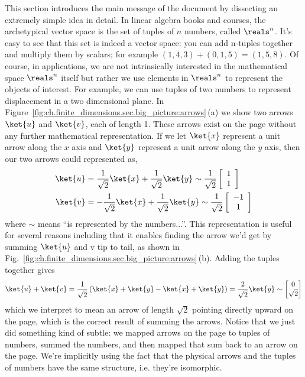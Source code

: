 
This section introduces the main message of the document by dissecting an extremely simple idea in detail.
In linear algebra books and courses, the archetypical vector space is the set of tuples of $n$ numbers, called $\reals^n$.
It's easy to see that this set is indeed a vector space: you can add n-tuples together and multiply them by scalars; for example $(1,4,3) + (0,1,5) = (1,5,8)$.
Of course, in applications, we are not intrinsically interested in the mathematical space $\reals^n$ itself but rather we use elements in $\reals^n$ to represent the objects of interest.
For example, we can use tuples of two numbers to represent displacement in a two dimensional plane.
In Figure~\ref{fig:ch.finite_dimensions.sec.big_picture:arrows}\,(a) we show two arrows $\ket{u}$ and $\ket{v}$, each of length 1.
These arrows exist on the page without any further mathematical representation.
If we let $\ket{x}$ represent a unit arrow along the $x$ axis and $\ket{y}$ represent a unit arrow along the $y$ axis, then our two arrows could represented as,
\begin{align}
  \ket{u}
  &= \frac{1}{\sqrt{2}} \ket{x} + \frac{1}{\sqrt{2}} \ket{y} \sim \frac{1}{\sqrt{2}} \left[ \begin{array}{c} 1 \\ 1 \end{array} \right] \\
  \ket{v}
  &= -\frac{1}{\sqrt{2}} \ket{x} + \frac{1}{\sqrt{2}} \ket{y} \sim \frac{1}{\sqrt{2}} \left[ \begin{array}{c} -1 \\ 1 \end{array} \right]
\end{align}
where $\sim$ means ``is represented by the numbers...''.
This representation is useful for several reasons including that it enables finding the arrow we'd get by summing $\ket{u}$ and $\text{v}$ tip to tail, as shown in Fig.~\ref{fig:ch.finite_dimensions.sec.big_picture:arrows}\,(b).
Adding the tuples together gives
\begin{displaymath}
  \ket{u} + \ket{v} = \frac{1}{\sqrt{2}} \left( \ket{x} + \ket{y} - \ket{x} + \ket{y} \right)
  = \frac{2}{\sqrt{2}}\ket{y}
  \sim
  \begin{bmatrix}
    0 \\
    \sqrt{2}
  \end{bmatrix}
\end{displaymath}
which we interpret to mean an arrow of length $\sqrt{2}$ pointing directly upward on the page, which is the correct result of summing the arrows.
Notice that we just did something kind of subtle: we mapped arrows on the page to tuples of numbers, summed the numbers, and then mapped that sum back to an arrow on the page.
We're implicitly using the fact that the physical arrows and the tuples of numbers have the same structure, i.e. they're isomorphic.

